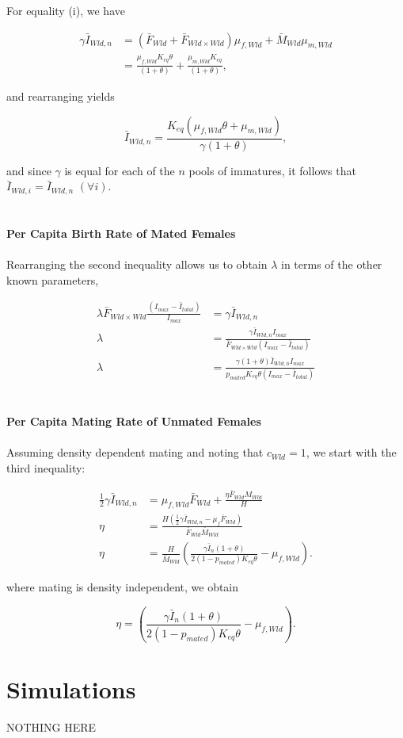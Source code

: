 \documentclass[]{article}  %
\begin{document}
For equality (i), we have

\begin{align*}
\gamma \bar{I}_{Wld, n} &= (\bar{F}_{Wld} + \bar{F}_{Wld \times Wld})\mu_{f, Wld} + \bar{M}_{Wld}\mu_{m, Wld} \\
&= \frac{\mu_{f, Wld} K_{eq} \theta}{(1 + \theta)} + \frac{\mu_{m, Wld} K_{eq}}{(1 + \theta)},
\end{align*}

\noindent and rearranging yields

$$ \bar{I}_{Wld, n} = \frac{K_{eq}(\mu_{f, Wld} \theta + \mu_{m, Wld})}{\gamma(1 + \theta)} ,$$

\noindent and since $\gamma$ is equal for each of the $n$ pools of immatures, it follows that $\bar{I}_{Wld, i} = \bar{I}_{Wld, n}$ $(\forall i)$.\\
\\
\\
{\bf Per Capita Birth Rate of Mated Females}
\\
\\
Rearranging the second inequality allows us to obtain $\lambda$ in terms of the other known parameters, 

\begin{align*}
\lambda \bar{F}_{Wld \times Wld}\frac{(I_{max} - \bar{I}_{total})}{I_{max}} &= \gamma \bar{I}_{Wld, n} \\
\lambda &= \frac{\gamma \bar{I}_{Wld, n}I_{max}}{\bar{F}_{Wld \times Wld}(I_{max} - \bar{I}_{total})} \\
\lambda &= \frac{\gamma (1 + \theta) \bar{I}_{Wld, n}I_{max}}{p_{mated}K_{eq}\theta(I_{max} - \bar{I}_{total})} 
\end{align*}
\\
\\
{\bf Per Capita Mating Rate of Unmated Females}
\\
\\
Assuming density dependent mating and noting that $c_{Wld} = 1$, we start with the third inequality:

\begin{align*}
\frac{1}{2}\gamma \bar{I}_{Wld, n} &= \mu_{f, Wld} \bar{F}_{Wld} + \frac{\eta \bar{F}_{Wld} M_{Wld}}{H}\\
\eta &= \frac{H(\tfrac{1}{2} \gamma \bar{I}_{Wld, n} - \mu_f \bar{F}_{Wld})}{\bar{F}_{Wld}\bar{M}_{Wld}}\\
\eta &= \frac{H}{\bar{M}_{Wld}} \left( \frac{\gamma\bar{I}_n (1 + \theta)}{2(1 - p_{mated}) K_{eq} \theta} - \mu_{f, Wld}\right).
\end{align*}

\noindent where mating is density independent, we obtain

$$ \eta = \left( \frac{\gamma\bar{I}_n (1 + \theta)}{2(1 - p_{mated}) K_{eq} \theta} - \mu_{f, Wld}\right). $$


\section{Simulations}

NOTHING HERE
\end{document}
